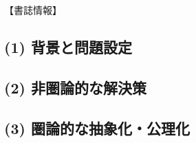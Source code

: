 \documentclass[
		head_space=20mm,
		foot_space=20mm,
		gutter=10mm,
		line_length=190mm
]{jlreq}
\begin{document}
\begin{framed}
	\noindent 【書誌情報】
\end{framed}

\subsection*{(1) 背景と問題設定}

\subsection*{(2) 非圏論的な解決策}

\subsection*{(3) 圏論的な抽象化・公理化}
\end{document}
